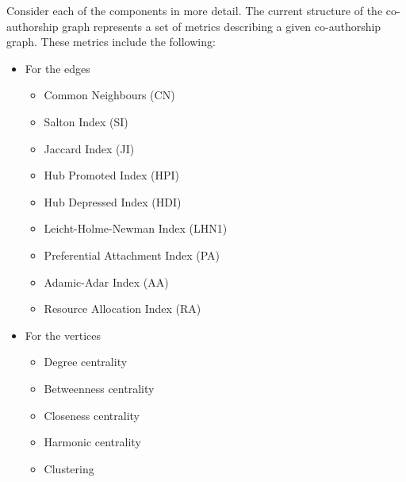 \documentclass[12pt]{report}
\theoremstyle{definition}
\begin{document}
Consider each of the components in more detail. 
The current structure of the co-authorship graph represents a set of metrics describing a given co-authorship graph.
These metrics include the following:

\begin{itemize}
	\item For the edges
	\begin{itemize}
		\item Common Neighbours (CN)
		\item Salton Index (SI)
		\item Jaccard Index (JI)
		\item Hub Promoted Index (HPI)
		\item Hub Depressed Index (HDI)
		\item Leicht-Holme-Newman Index (LHN1)
		\item Preferential Attachment Index (PA)
		\item Adamic-Adar Index (AA)
		\item Resource Allocation Index (RA)
	\end{itemize}
	\item For the vertices 
	\begin{itemize}
		\item Degree centrality
		\item Betweenness centrality
		\item Closeness centrality
		\item Harmonic centrality
		\item Clustering
	\end{itemize}
\end{itemize}
\end{document}
